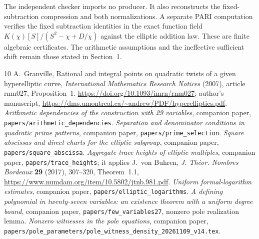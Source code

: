 \documentclass[11pt,a4paper]{article}
\begin{document}
The independent checker imports no producer. It also reconstructs
the fixed-subtraction compression and both normalizations. A separate
PARI computation verifies the fixed subtraction identities in the exact
function field $K(\chi)[S]/(S^2-\chi+D/\chi)$ against the elliptic
addition law. These are finite algebraic certificates. The arithmetic
assumptions and the ineffective sufficient shift remain those stated
in Section~1.

\begin{thebibliography}{10}
A.~Granville, Rational and integral points on quadratic twists of a given
hyperelliptic curve, \emph{International Mathematics Research Notices}
(2007), article rnm027, Proposition~1.
\url{https://doi.org/10.1093/imrn/rnm027}; author's manuscript,
\url{https://dms.umontreal.ca/~andrew/PDF/hyperelliptics.pdf}.
\emph{Arithmetic dependencies of the construction with 29 variables},
companion paper, \nolinkurl{papers/arithmetic_dependencies}.
\emph{Separation and denominator conditions in quadratic prime patterns},
companion paper, \nolinkurl{papers/prime_selection}.
\emph{Square abscissas and direct charts for the elliptic subgroup},
companion paper, \nolinkurl{papers/square_abscissa}.
\emph{Aggregate trace heights of elliptic multiples}, companion paper,
\nolinkurl{papers/trace_heights}; it applies J.~von Buhren,
\emph{J. Th\'eor. Nombres Bordeaux} \textbf{29} (2017), 307--320,
Theorem~1.1, \url{https://www.numdam.org/item/10.5802/jtnb.981.pdf}.
\emph{Uniform formal-logarithm estimates}, companion paper,
\nolinkurl{papers/elliptic_logarithms}.
\emph{A defining polynomial in twenty-seven variables: an existence
theorem with a uniform degree bound}, companion paper,
\nolinkurl{papers/few_variables27}, nonzero pole realization lemma.
\emph{Nonzero witnesses in the pole equations}, companion paper,
\nolinkurl{papers/pole_parameters/pole_witness_density_20261109_v14.tex}.
\end{thebibliography}
\end{document}
